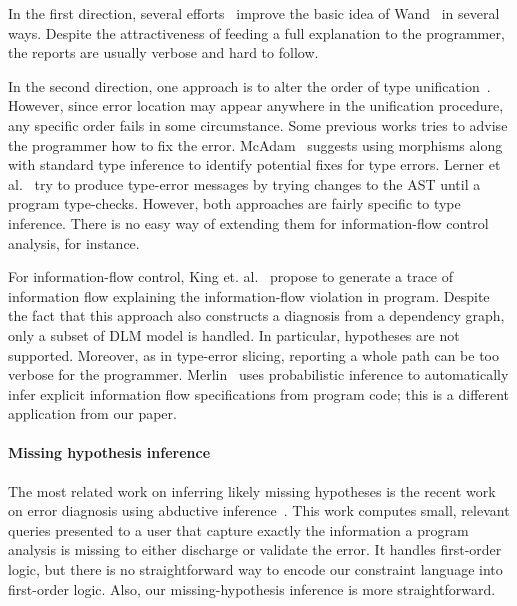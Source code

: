 In the first direction, several efforts~\cite{choppella95,
haack:slicing, tip:slicing} improve the basic idea of
Wand~\cite{wand-errorfinding} in several ways. Despite the
attractiveness of feeding a full explanation to the programmer, the
reports are usually verbose and hard to follow.

In the second direction, one approach is to alter the order of type
unification~\cite{lee:toplas, mcadam:unification}. However, since
error location may appear anywhere in the unification procedure, any
specific order fails in some circumstance. Some previous works tries
to advise the programmer how to fix the error.
McAdam~\cite{mcadam:thesis} suggests using morphisms along with
standard type inference to identify potential fixes for type errors.
Lerner et al.~\cite{lerner:pldi07} try to produce type-error messages
by trying changes to the AST until a program type-checks.  However,
both approaches are fairly specific to type inference. There is no
easy way of extending them for information-flow control analysis, for
instance.

For information-flow control, King et. al.~\cite{king:fse} propose to
generate a trace of information flow explaining the information-flow
violation in program. Despite the fact that this approach also
constructs a diagnosis from a dependency graph, only a subset of DLM
model is handled. In particular, hypotheses are not supported.
Moreover, as in type-error slicing, reporting a whole path can be
too verbose for the programmer.  Merlin~\cite{livshits:merlin} uses
probabilistic inference to automatically infer explicit information
flow specifications from program code; this is a different
application from our paper.

\paragraph{Missing hypothesis inference}

The most related work on inferring likely missing hypotheses is the
recent work on error diagnosis using abductive
inference~\cite{dillig:pldi12}. This work computes small, relevant
queries presented to a user that capture exactly the information a
program analysis is missing to either discharge or validate the error.
It handles first-order logic, but there is no straightforward
way to encode our constraint language into first-order logic.
Also, our missing-hypothesis inference is more straightforward.






